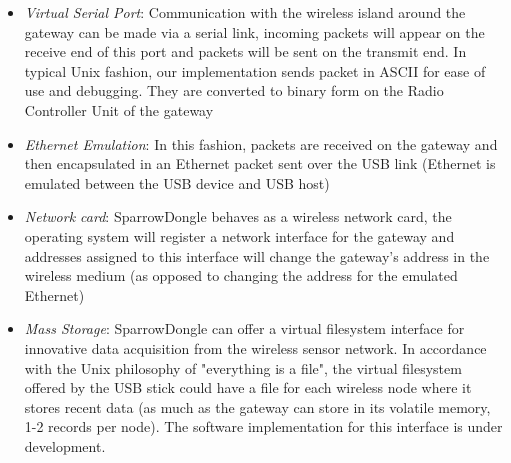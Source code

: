 \begin{itemize}

\item \textit{Virtual Serial Port}: Communication with the wireless island
around the gateway can be made via a serial link, incoming packets will appear
on the receive end of this port and packets will be sent on the transmit end.
In typical Unix fashion, our implementation sends packet in ASCII for ease of
use and debugging. They are converted to binary form on the Radio Controller
Unit of the gateway

\item \textit{Ethernet Emulation}: In this fashion, packets are received on the
gateway and then encapsulated in an Ethernet packet sent over the USB link
(Ethernet is emulated between the USB device and USB host)

\item \textit{Network card}: SparrowDongle behaves as a wireless network card,
the operating system will register a network interface for the gateway and
addresses assigned to this interface will change the gateway's address in the
wireless medium (as opposed to changing the address for the emulated Ethernet)

\item \textit{Mass Storage}: SparrowDongle can offer a virtual filesystem
interface for innovative data acquisition from the wireless sensor network. In
accordance with the Unix philosophy of "everything is a file", the virtual
filesystem offered by the USB stick could have a file for each wireless node
where it stores recent data (as much as the gateway can store in its volatile
memory, 1-2 records per node). The software implementation for this interface
is under development.

 \end{itemize}

 

